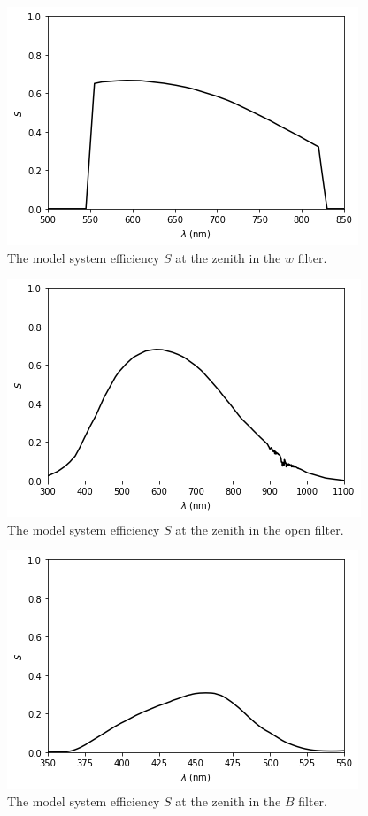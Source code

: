 \begin{figure}
\begin{center}
\includegraphics[width=0.7\linewidth]{figures/huitzi-f20-S-w.png}
\medskip
\caption{The model system efficiency $S$ at the zenith in the $w$ filter.}
\end{center}
\end{figure}

\begin{figure}
\begin{center}
\includegraphics[width=0.7\linewidth]{figures/huitzi-f20-S-open.png}
\medskip
\caption{The model system efficiency $S$ at the zenith in the open filter.}
\end{center}
\end{figure}

\begin{figure}
\begin{center}
\includegraphics[width=0.7\linewidth]{figures/huitzi-f20-S-JC-B.png}
\medskip
\caption{The model system efficiency $S$ at the zenith in the $B$ filter.}
\end{center}
\end{figure}

